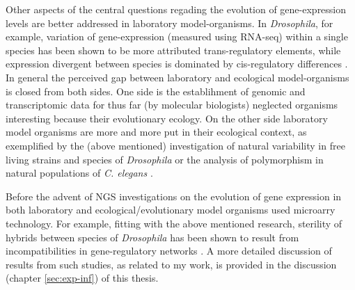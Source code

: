 Other aspects of the central questions regading the evolution of
gene-expression levels are better addressed in laboratory
model-organisms. In \textit{Drosophila}, for example, variation of
gene-expression (measured using RNA-seq) within a single species has
been shown to be more attributed trans-regulatory elements, while
expression divergent between species is dominated by cis-regulatory
differences \cite{pmid20354124}. In general the perceived gap between
laboratory and ecological model-organisms is closed from both
sides. One side is the establihment of genomic and transcriptomic data
for thus far (by molecular biologists) neglected organisms interesting
because their evolutionary ecology. On the other side laboratory model
organisms are more and more put in their ecological context, as
exemplified by the (above mentioned) investigation of natural
variability in free living strains and species of \textit{Drosophila}
or the analysis of polymorphism in natural populations of
\textit{C. elegans} \cite{pmid20133352}.

Before the advent of NGS investigations on the evolution of gene
expression in both laboratory and ecological/evolutionary model
organisms used microarry technology. For example, fitting with the
above mentioned research, sterility of hybrids between species of
\textit{Drosophila} has been shown to result from incompatibilities in
gene-regulatory networks \cite{pmid16757655}. A more detailed
discussion of results from such studies, as related to my work, is
provided in the discussion (chapter \ref{sec:exp-inf}) of this thesis.





